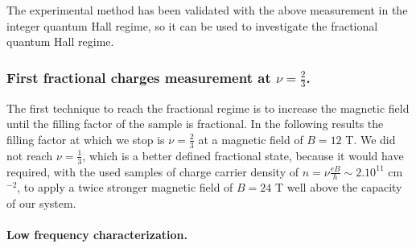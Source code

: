The experimental method has been validated with the above measurement in the integer quantum Hall regime, so it can be used to investigate the fractional quantum Hall regime.

\subsubsection*{First fractional charges measurement at $\nu = \frac{2}{3}$.}

The first technique to reach the fractional regime is to increase the magnetic field until the filling factor of the sample is fractional.
In the following results the filling factor at which we stop is $\nu = \frac{2}{3}$ at a magnetic field of $B = 12$ T.
We did not reach $\nu = \frac{1}{3}$, which is a better defined fractional state, because it would have required, with the used samples of charge carrier density of $n = \nu\frac{eB}{h} \sim 2.10^{11}$ cm$^{-2}$, to apply a twice stronger magnetic field of $B = 24$ T well above the capacity of our system.

\paragraph*{Low frequency characterization.}

